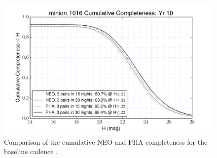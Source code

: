 \begin{figure}[bh]
\includegraphics[angle=0,width=0.49\hsize:,clip]{figs/solarsystem/minion_1016_CumulativeCompleteness_NEO_and_PHA_Cumulative_Completeness}
\caption{%
Comparison of the cumulative NEO and PHA completeness for the baseline cadence
.}
\label{fig:neopha}
\end{figure}

